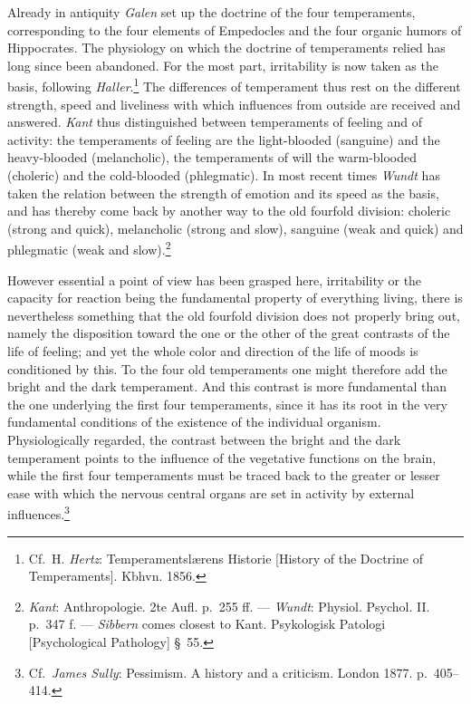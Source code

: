 \documentclass[12pt,a4paper]{book}
\newcommand{\opage}[1]{\marginnote{\footnotesize\textit{[#1]}}}
\begin{document}
Already in antiquity \emph{Galen} set up the doctrine of the four
temperaments, corresponding to the four elements of Empedocles and the
four organic humors of Hippocrates. The physiology on which the doctrine
of temperaments relied has long since been abandoned. For the most part,
irritability is now taken as the basis, following
\emph{Haller}.\footnote{Cf.\ H. \emph{Hertz}: Temperamentslærens Historie
[History of the Doctrine of Temperaments]. Kbhvn. 1856.} The differences
of temperament thus rest on the different strength, speed and liveliness
with which
\opage{406}influences from outside are received and answered. \emph{Kant}
thus distinguished between temperaments of feeling and of activity: the
temperaments of feeling are the light-blooded (sanguine) and the
heavy-blooded (melancholic), the temperaments of will the warm-blooded
(choleric) and the cold-blooded (phlegmatic). In most recent times
\emph{Wundt} has taken the relation between the strength of emotion and
its speed as the basis, and has thereby come back by another way to the
old fourfold division: choleric (strong and quick), melancholic (strong
and slow), sanguine (weak and quick) and phlegmatic (weak and
slow).\footnote{\emph{Kant}: Anthropologie. 2te Aufl. p.~255 ff. ---
\emph{Wundt}: Physiol. Psychol. II. p.~347 f. --- \emph{Sibbern} comes
closest to Kant. Psykologisk Patologi [Psychological Pathology] §~55.}

However essential a point of view has been grasped here, irritability or
the capacity for reaction being the fundamental property of everything
living, there is nevertheless something that the old fourfold division
does not properly bring out, namely the disposition toward the one or the
other of the great contrasts of the life of feeling; and yet the whole
color and direction of the life of moods is conditioned by this. To the
four old temperaments one might therefore add the bright and the dark
temperament. And this contrast is more fundamental than the one
underlying the first four temperaments, since it has its root in the very
fundamental conditions of the existence of the individual organism.
Physiologically regarded, the contrast between the bright and the dark
temperament points to the influence of the vegetative functions on the
brain, while the first four temperaments must be traced back to the
greater or lesser ease with which the nervous central organs are set in
activity by external
influences.\footnote{Cf.\ \emph{James Sully}: Pessimism. A history and a
criticism. London 1877. p.~405--414.}
\end{document}
